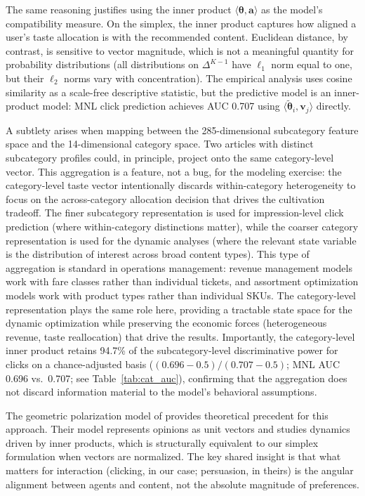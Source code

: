 \documentclass[11pt]{article}
\begin{document}
The same reasoning justifies using the inner product $\langle \boldsymbol{\theta}, \mathbf{a} \rangle$ as the model's compatibility measure. On the simplex, the inner product captures how aligned a user's taste allocation is with the recommended content. Euclidean distance, by contrast, is sensitive to vector magnitude, which is not a meaningful quantity for probability distributions (all distributions on $\Delta^{K-1}$ have $\ell_1$ norm equal to one, but their $\ell_2$ norms vary with concentration). The empirical analysis uses cosine similarity as a scale-free descriptive statistic, but the predictive model is an inner-product model: MNL click prediction achieves AUC 0.707 using $\langle \tilde{\boldsymbol{\theta}}_i, \mathbf{v}_j \rangle$ directly.

A subtlety arises when mapping between the 285-dimensional subcategory feature space and the 14-dimensional category space. Two articles with distinct subcategory profiles could, in principle, project onto the same category-level vector. This aggregation is a feature, not a bug, for the modeling exercise: the category-level taste vector intentionally discards within-category heterogeneity to focus on the across-category allocation decision that drives the cultivation tradeoff. The finer subcategory representation is used for impression-level click prediction (where within-category distinctions matter), while the coarser category representation is used for the dynamic analyses (where the relevant state variable is the distribution of interest across broad content types). This type of aggregation is standard in operations management: revenue management models work with fare classes rather than individual tickets, and assortment optimization models work with product types rather than individual SKUs. The category-level representation plays the same role here, providing a tractable state space for the dynamic optimization while preserving the economic forces (heterogeneous revenue, taste reallocation) that drive the results. Importantly, the category-level inner product retains 94.7\% of the subcategory-level discriminative power for clicks on a chance-adjusted basis ($(0.696-0.5)/(0.707-0.5)$; MNL AUC 0.696 vs.\ 0.707; see Table~\ref{tab:cat_auc}), confirming that the aggregation does not discard information material to the model's behavioral assumptions.

The geometric polarization model of \citet{hkazla2019geometric} provides theoretical precedent for this approach. Their model represents opinions as unit vectors and studies dynamics driven by inner products, which is structurally equivalent to our simplex formulation when vectors are normalized. The key shared insight is that what matters for interaction (clicking, in our case; persuasion, in theirs) is the angular alignment between agents and content, not the absolute magnitude of preferences.
\end{document}
